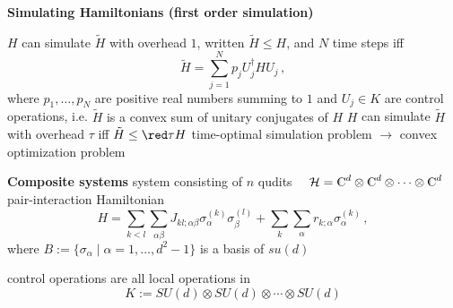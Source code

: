 \documentclass[portrait]{seminar}
\begin{document}
\begin{slide}
{\large {\bf Simulating Hamiltonians (first order simulation)}} 

\vfill
{\blue $H$ can simulate $\tilde{H}$ with overhead $1$}, written
$\tilde{H}\le H$, and {\blue $N$ time steps} iff
\[
\tilde{H}=\sum_{j=1}^N p_j U_j^\dagger H U_j\,,
\]
where $p_1,\ldots,p_N$ are positive real numbers summing to $1$ and
$U_j\in K$ are control operations, i.e.
{\red $\tilde{H}$ is a convex sum of unitary conjugates of $H$}
\vfill
$H$ can simulate $\tilde{H}$ with overhead {\red $\tau$} iff 
$\tilde{H} \le {\red \tau} H$ 
\vfill 
{\red time-optimal simulation} problem $\longrightarrow$
{\red convex optimization} problem 
\vfill
\end{slide}

\begin{slide}
{\large {\bf Composite systems}}
\vfill
system consisting of {\blue $n$ qudits}  
$\quad {\cal H}=\C^d\otimes\C^d\otimes\cdots\otimes\C^d$ 
\vfill
{\blue pair-interaction Hamiltonian}
\[
H = 
\sum_{k<l} \sum_{\alpha\beta} J_{kl;\alpha\beta} 
\sigma_\alpha^{(k)}\sigma_\beta^{(l)} +
\sum_k \sum_{\alpha} r_{k;\alpha} \sigma_\alpha^{(k)}\,,
\]
where $B:=\{\sigma_\alpha\mid\alpha=1,\ldots,d^2-1\}$ is a basis of $su(d)$


\vfill
{\blue control operations} are all {\red local} operations in
\[
K:=SU(d)\otimes SU(d)\otimes\cdots\otimes SU(d)
\]
\vfill
\end{slide}
\end{document}
